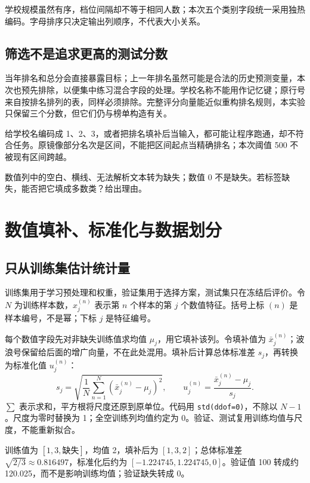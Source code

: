 \documentclass[UTF8,a4paper,11pt,fontset=fandol]{ctexart}
\begin{document}
学校规模虽然有序，档位间隔却不等于相同人数；本次五个类别字段统一采用独热编码。字母排序只决定输出列顺序，不代表大小关系。
\subsection{筛选不是追求更高的测试分数}
当年排名和总分会直接暴露目标；上一年排名虽然可能是合法的历史预测变量，本次也预先排除，以便集中练习混合字段的处理。学校名称不能用作记忆键；原行号来自按排名排列的表，同样必须排除。完整评分向量能近似重构排名规则，本实验只保留三个分数，但它们仍与榜单构造有关。
\begin{pitfallbox}[不能把数值化等同于可用]
给学校名编码成 1、2、3，或者把排名填补后当输入，都可能让程序跑通，却不符合任务。原镜像部分名次是区间，不能把区间起点当精确排名；本次阈值 500 不被现有区间跨越。
\end{pitfallbox}
\begin{questionbox}[C1：缺失是什么]
数值列中的空白、横线、无法解析文本转为缺失；数值 0 不是缺失。若标签缺失，能否把它填成多数类？给出理由。
\end{questionbox}
\clearpage
\section{数值填补、标准化与数据划分}
\subsection{只从训练集估计统计量}
训练集用于学习预处理和权重，验证集用于选择方案，测试集只在冻结后评价。令 $N$ 为训练样本数，$x_j^{(n)}$ 表示第 $n$ 个样本的第 $j$ 个数值特征。括号上标 $(n)$ 是样本编号，不是幂；下标 $j$ 是特征编号。

每个数值字段先对非缺失训练值求均值 $\mu_j$，用它填补该列。令填补值为 $\bar x_j^{(n)}$；波浪号保留给后面的增广向量，不在此处混用。填补后计算总体标准差 $s_j$，再转换为标准化值 $u_j^{(n)}$：
\begin{equation}
s_j=\sqrt{\frac1N\sum_{n=1}^{N}(\bar x_j^{(n)}-\mu_j)^2},\qquad
u_j^{(n)}=\frac{\bar x_j^{(n)}-\mu_j}{s_j}.
\end{equation}
$\sum$ 表示求和，平方根将尺度还原到原单位。代码用 \texttt{std(ddof=0)}，不除以 $N-1$。尺度为零时替换为 1；全空训练列均值约定为 0。验证、测试复用训练均值与尺度，不能重新拟合。
\begin{examplebox}[C2：可复核的小例子]
训练值为 $[1,3,\text{缺失}]$，均值 2，填补后为 $[1,3,2]$；总体标准差 $\sqrt{2/3}\approx0.816497$，标准化后约为 $[-1.224745,1.224745,0]$。验证值 100 转成约 120.025，而不是影响训练均值；验证缺失转成 0。
\end{examplebox}
\end{document}
